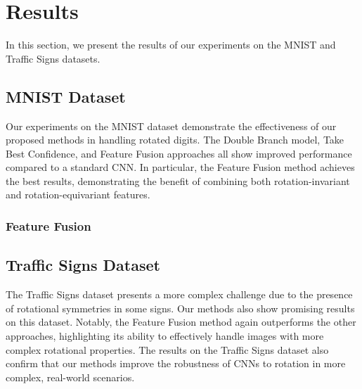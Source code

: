 \section{Results}
\label{sec:results}

In this section, we present the results of our experiments on the MNIST and Traffic Signs datasets.

\subsection{MNIST Dataset}
Our experiments on the MNIST dataset demonstrate the effectiveness of our proposed methods in handling rotated digits. The Double Branch model, Take Best Confidence, and Feature Fusion approaches all show improved performance compared to a standard CNN. In particular, the Feature Fusion method achieves the best results, demonstrating the benefit of combining both rotation-invariant and rotation-equivariant features.

\subsubsection{Feature Fusion}



\subsection{Traffic Signs Dataset}
The Traffic Signs dataset presents a more complex challenge due to the presence of rotational symmetries in some signs. Our methods also show promising results on this dataset. Notably, the Feature Fusion method again outperforms the other approaches, highlighting its ability to effectively handle images with more complex rotational properties. The results on the Traffic Signs dataset also confirm that our methods improve the robustness of CNNs to rotation in more complex, real-world scenarios.